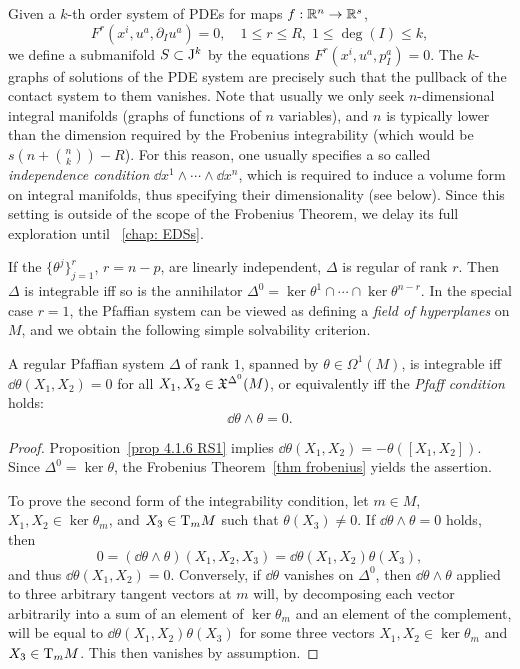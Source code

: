 \begin{rem}
    Given a $k$-th order system of PDEs for maps $f:\mathbb{R}^n\to \mathbb{R}^s$, 
    \[F^r(x^i,u^a,\partial_I u^a)=0,\quad 1\leq r\leq R,\; 1\leq \deg(I)\leq k,\]
    we define a submanifold $S\subset \mathrm{J}^k$ by the equations $F^r(x^i,u^a,p_I^a)=0$. The $k$-graphs of solutions of the PDE system are precisely such that the pullback of the contact system to them vanishes. Note that usually we only seek $n$-dimensional integral manifolds (graphs of functions of $n$ variables), and $n$ is typically lower than the dimension required by the Frobenius integrability (which would be $s\left(n+\binom{n}{k}\right)-R$). For this reason, one usually specifies a so called \emph{independence condition} $\dd x^1\wedge\cdots\wedge\dd x^n$, which is required to induce a volume form on integral manifolds, thus specifying their dimensionality (see below). Since this setting is outside of the scope of the Frobenius Theorem, we delay its full exploration until \Sect~\ref{chap: EDSs}.
\end{rem}

If the $\{\theta^j\}_{j=1}^r$, $r=n-p$, are linearly independent, $\Delta$ is regular of rank $r$. Then $\Delta$ is integrable iff so is the annihilator $\Delta^0=\ker\theta^1\cap\cdots\cap\ker\theta^{n-r}$. In the special case $r=1$, the Pfaffian system can be viewed as defining a \emph{field of hyperplanes} on $M$, and we obtain the following simple solvability criterion.

\begin{prop}\label{prop 4.7.6 RS1 pfaffian rank 1}
    A regular Pfaffian system $\Delta$ of rank $1$, spanned by $\theta\in\Omega^1(M)$, is integrable iff $\dd\theta(X_1,X_2)=0$ for all $X_1,X_2\in\mathfrak{X}^{\Delta^0}(M)$, or equivalently iff the \emph{Pfaff condition} holds:
    \[\dd\theta\wedge\theta=0.\]
\end{prop}
\begin{proof}
    Proposition~\ref{prop 4.1.6 RS1} implies $\dd\theta(X_1,X_2)=-\theta([X_1,X_2])$. Since $\Delta^0=\ker\theta$, the Frobenius Theorem~\ref{thm frobenius} yields the assertion. 

    To prove the second form of the integrability condition, let $m\in M$, $X_1,X_2\in\ker\theta_m$, and $X_3\in \mathrm{T}_mM$ such that $\theta(X_3)\neq 0$. If $\dd\theta\wedge\theta=0$ holds, then 
    \[0=(\dd\theta\wedge\theta)(X_1,X_2,X_3)=\dd\theta(X_1,X_2)\theta(X_3),\]
    and thus $\dd \theta(X_1,X_2)=0$. Conversely, if $\dd\theta$ vanishes on $\Delta^0$, then $\dd \theta\wedge\theta$ applied to three arbitrary tangent vectors at $m$ will, by decomposing each vector arbitrarily into a sum of an element of $\ker\theta_m$ and an element of the complement, will be equal to $\dd \theta(X_1,X_2)\theta(X_3)$ for some three vectors $X_1,X_2\in \ker\theta_m$ and $X_3\in \mathrm{T}_m M$. This then vanishes by assumption.
\end{proof}

